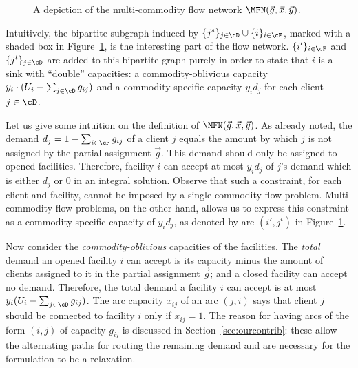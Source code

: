 \begin{figure}[tb]
\begin{center}
 \end{center}

\caption{A depiction of the multi-commodity flow network $\MFN(\vec{g},\vec{x},\vec{y})$.}
\label{fig:MFN}
\end{figure}

\begin{remark}
Intuitively, the bipartite subgraph induced by $\{j^s\}_{j\in\cD}\cup\{i\}_{i\in\cF}$, marked with a shaded box in Figure~\ref{fig:MFN}, is the interesting part of the flow network. $\{i'\}_{i\in\cF}$ and $\{j^t\}_{j\in\cD}$ are added to this bipartite graph purely in order to state that $i$ is a sink with ``double'' capacities: a commodity-oblivious capacity $y_i\cdot( U_i - \sum_{j\in \cD} g_{ij})$ and a commodity-specific capacity $y_i d_j$ for each client $j\in \cD$.


\end{remark}

Let us give some intuition on the definition of $\MFN(\vec{g},\vec{x},\vec{y})$. As already noted,
the demand $d_j = 1 - \sum_{i\in \cF} g_{ij}$ of a client $j$ equals the amount by which $j$ is not
assigned by the partial assignment $\vec{g}$. This demand should only be assigned to opened
facilities. Therefore, facility $i$ can accept at most $y_i d_j$ of $j$'s demand which is either
$d_j$ or $0$ in an integral solution.
Observe that such a constraint, for each client and facility, cannot be imposed by a single-commodity flow problem.
Multi-commodity flow problems, on the other hand, allows us to express this constraint as a commodity-specific capacity of $y_id_j$, as denoted by arc $(i',j^t)$ in Figure~\ref{fig:MFN}.

Now consider the \emph{commodity-oblivious} capacities of the facilities. The \emph{total} demand an opened facility $i$ can accept
is its capacity minus the amount of clients assigned to it in the partial assignment $\vec{g}$; and
a closed facility can accept no demand. Therefore, the total demand a facility $i$ can accept is at
most $y_i (U_i - \sum_{j\in \cD} g_{ij})$. The arc capacity $x_{ij}$ of an arc $(j,i)$ says that
client $j$ should be connected to facility $i$ only if $x_{ij} =1$. The reason for having arcs of
the form $(i,j)$ of capacity $g_{ij}$ is discussed in Section~\ref{sec:ourcontrib}: these allow the alternating paths for routing the remaining demand and are
necessary for the formulation to be a relaxation.


